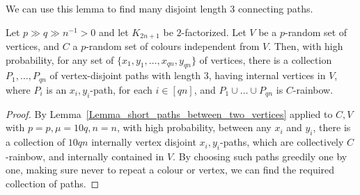 We can use this lemma to find many disjoint length $3$ connecting paths.
\begin{lemma}\label{Lemma_few_connecting_paths}  Let  $p\gg q \gg n^{-1}>0$ and let $K_{2n+1}$ be $2$-factorized. Let $V$ be a $p$-random set of vertices, and $C$ a $p$-random set of colours independent from $V$.
Then, with high probability, for any set of $\{x_1, y_1, \dots, x_{q n}, y_{q n}\}$ of vertices,
 there is a collection $P_1, \dots, P_{q n}$ of vertex-disjoint paths with length $3$, having internal vertices in $V$, where $P_i$ is an $x_i,y_i$-path, for each $i\in [qn]$, and $P_1\cup \dots\cup P_{q n}$ is $C$-rainbow.
\end{lemma}
\begin{proof}
By Lemma~\ref{Lemma_short_paths_between_two_vertices} applied to $C,V$ with $p=p, \mu=10q,  n=n$, with high probability, between any $x_i$ and $y_i$, there is a collection of $10q n$ internally vertex disjoint $x_i,y_i$-paths, which are collectively $C$-rainbow, and internally contained in $V$. By choosing such paths greedily one by one, making sure never to repeat a colour or vertex,  we can find the required collection of paths.
\end{proof}